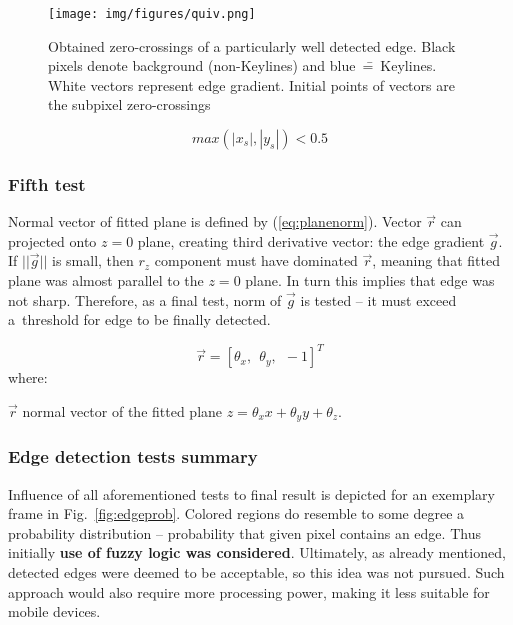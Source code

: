 \begin{figure}[ht]
	\centering\texttt{[image: img/figures/quiv.png]}
	\caption{ Obtained zero-crossings of a particularly well detected edge. Black pixels denote background (non-Keylines) and blue~\==~Keylines. White vectors represent edge gradient. Initial points of vectors are the subpixel zero-crossings }
	\label{fig:quiv}
\end{figure}

\begin{equation}
max(|x_s|, |y_s|) < 0.5
\label{eq:subpix_inside}
\end{equation}

\subsubsection*{Fifth test}
\label{edge_fith}

Normal vector of fitted plane is defined by (\ref{eq:planenorm}). Vector $\vec{r}$ can projected onto $z=0$ plane, creating third derivative vector: the edge gradient $\vec{g}$. If $||\vec{g}||$ is small, then $r_{z}$ component must have dominated $\vec{r}$, meaning that fitted plane was almost parallel to the $z=0$ plane. In turn this implies that edge was not sharp. Therefore, as a final test, norm of $\vec{g}$ is tested -- it must exceed a~threshold for edge to be finally detected.

\begin{equation}
\vec{r} = [\theta_{x},\ \ \theta_{y},\ \ -1]^T
\label{eq:planenorm}
\end{equation}
where:
\begin{eqwhere}[2cm]
	\item[$\vec{r}$] normal vector of the fitted plane $z = \theta_{x}x + \theta_{y}y + \theta_{z}$.
\end{eqwhere}

\subsubsection*{Edge detection tests summary}

Influence of all aforementioned tests to final result is depicted for an exemplary frame in Fig.~\ref{fig:edgeprob}. Colored regions do resemble to some degree a probability distribution -- probability that given pixel contains an edge. Thus initially \textbf{use of fuzzy logic was considered}. Ultimately, as already mentioned, detected edges were deemed to be acceptable, so this idea was not pursued. Such approach would also require more processing power, making it less suitable for mobile devices.

